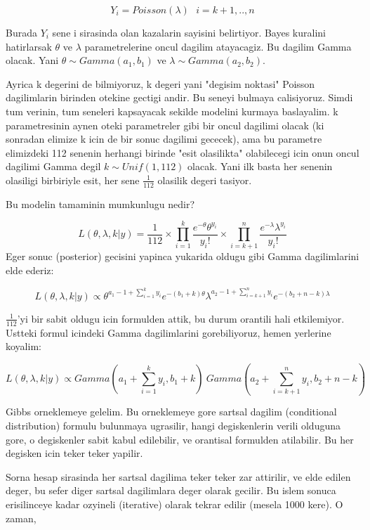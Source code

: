\documentclass[12pt,fleqn]{article}\usepackage{../common}
\begin{document}
$$ Y_i = Poisson(\lambda) \ \ \ i=k+1,..,n $$

Burada $Y_i$ sene i sirasinda olan kazalarin sayisini belirtiyor. Bayes kuralini
hatirlarsak $\theta$ ve $\lambda$ parametrelerine oncul dagilim atayacagiz. Bu
dagilim Gamma olacak. Yani $\theta \sim Gamma(a_1, b_1)$ ve $\lambda \sim
Gamma(a_2, b_2)$.

Ayrica k degerini de bilmiyoruz, k degeri yani "degisim noktasi" Poisson
dagilimlarin birinden otekine gectigi andir. Bu seneyi bulmaya
calisiyoruz. Simdi tum verinin, tum seneleri kapsayacak sekilde modelini kurmaya
baslayalim. k parametresinin aynen oteki parametreler gibi bir oncul dagilimi
olacak (ki sonradan elimize k icin de bir sonuc dagilimi gececek), ama bu
parametre elimizdeki 112 senenin herhangi birinde "esit olasilikta" olabilecegi
icin onun oncul dagilimi Gamma degil $k \sim Unif(1,112)$ olacak. Yani ilk basta
her senenin olasiligi birbiriyle esit, her sene $\frac{1}{112}$ olasilik degeri
tasiyor.

Bu modelin tamaminin mumkunlugu nedir?

$$ L(\theta, \lambda, k | y) = \frac{1}{112} \times \displaystyle \prod_{i=1}^k
\frac{e^{-\theta}\theta^{y_i}}{y_i!}  \times \displaystyle \prod_{i=k+1}^n
\frac{e^{-\lambda}\lambda^{y_i}}{y_i!} 
 $$
Eger sonuc (posterior) gecisini yapinca yukarida oldugu gibi Gamma dagilimlarini
elde ederiz:

$$ L(\theta, \lambda, k | y)  \propto 
\theta^{a_1-1+\sum_{i=1}^{k} y_i}e^{-(b_1+k)\theta} 
\lambda^{a_2-1+\sum_{i=k+1}^n y_i}e^{-(b_2+n-k)\lambda} 
 $$

$\frac{1}{112}$'yi bir sabit oldugu icin formulden attik, bu durum orantili hali
etkilemiyor. Ustteki formul icindeki Gamma dagilimlarini gorebiliyoruz, hemen
yerlerine koyalim:

$$ L(\theta, \lambda, k | y)  \propto 
Gamma(a_1 + \sum_{i=1}^{k} y_i, b_1+k) \
Gamma(a_2 + \sum_{i=k+1}^{n} y_i, b_2+n-k)
 $$

Gibbs orneklemeye gelelim. Bu orneklemeye gore sartsal dagilim (conditional
distribution) formulu bulunmaya ugrasilir, hangi degiskenlerin verili olduguna
gore, o degiskenler sabit kabul edilebilir, ve orantisal formulden
atilabilir. Bu her degisken icin teker teker yapilir. 

Sorna hesap sirasinda her sartsal dagilima teker teker zar attirilir, ve elde
edilen deger, bu sefer diger sartsal dagilimlara deger olarak gecilir. Bu islem
sonuca erisilinceye kadar ozyineli (iterative) olarak tekrar edilir (mesela 1000
kere). O zaman,
\end{document}
